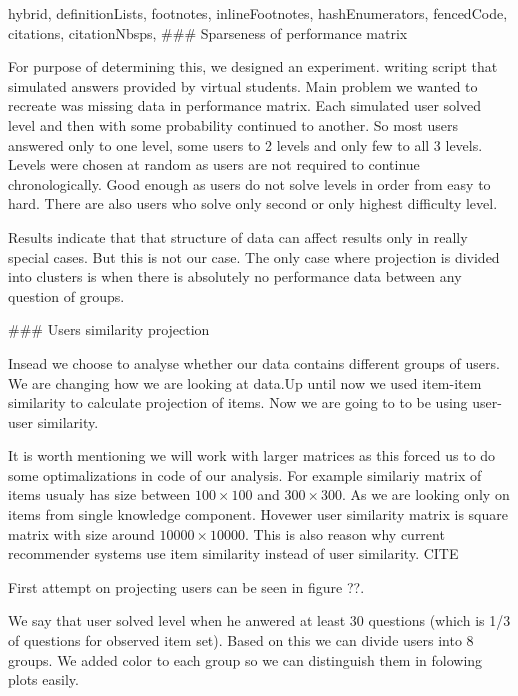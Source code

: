 \documentclass[
  digital, %
  table,   %
  nolof,     %
  nolot,     %
  nocover
]{fithesis3}
\begin{document}
\begin{markdown*}{%
  hybrid,
  definitionLists,
  footnotes,
  inlineFootnotes,
  hashEnumerators,
  fencedCode,
  citations,
  citationNbsps,
}
### Sparseness of performance matrix


For purpose of determining this, we designed an experiment.
writing script that simulated answers provided by virtual students. Main problem we wanted to recreate was missing data in performance matrix. Each simulated user solved level and then with some probability continued to another. So most users answered only to one level, some users to 2 levels and only few to all 3 levels. Levels were chosen at random as users are not required to continue chronologically. Good enough as users do not solve levels in order from easy to hard. There are also users who solve only second or only highest difficulty level.

Results indicate that that structure of data can affect results only in really special cases. But this is not our case. The only case where projection is divided into clusters is when there is absolutely no performance data between any question of groups.

### Users similarity projection

Insead we choose to analyse whether our data contains different groups of users. We are changing how we are looking at data.Up until now we used item-item similarity to calculate projection of items. Now we are going to to be using user-user similarity.

It is worth mentioning we will work with larger matrices as this forced us to do some optimalizations in code of our analysis. For example similariy matrix of items usualy has size between $100\times 100$ and $300\times 300$. As we are looking only on items from single knowledge component. Hovewer user similarity matrix is square matrix with size around $10 000\times 10 000$. This is also reason why current recommender systems use item similarity instead of user similarity. CITE

First attempt on projecting users can be seen in figure ??.


We say that user solved level when he anwered at least 30 questions (which is 1/3 of questions for observed item set). Based on this we can divide users into 8 groups. We added color to each group so we can distinguish them in folowing plots easily.


\end{markdown*}
\end{document}
